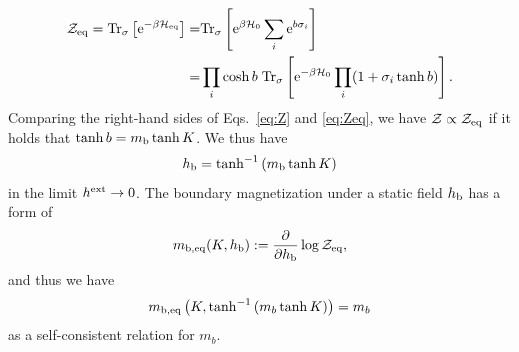 \begin{align}
\mathcal{Z}_{\rm eq}=\mathrm{Tr}_{\sigma}\left[\mathrm{e}^{-\beta\mathcal{H}_{\rm eq}}\right]=&\mathrm{Tr}_{\sigma}\left[\mathrm{e}^{\beta \mathcal{H}_{0}}\sum_{i}\mathrm{e}^{b\sigma_{i}}\right]\\
=&\prod_{i}\cosh b\;\mathrm{Tr}_{\sigma}\left[\mathrm{e}^{-\beta\mathcal{H}_{0}}\prod_{i}(1+\sigma_{i}\tanh b)\right].\label{eq:Zeq}
\end{align}
Comparing the right-hand sides of Eqs.~\eqref{eq:Z} and \eqref{eq:Zeq}, we have $\mathcal{Z} \propto\mathcal{Z}_{\rm eq}$ if it holds that $\tanh b=m_{\rm b}\tanh K$. We thus have
\begin{align}
h_{\rm b}=\tanh^{-1}\left(m_{\rm b}\tanh K\right)
\end{align}
in the limit $h^{\rm ext}\to 0$.
The boundary magnetization under a static field $h_{\rm b}$ has a form of
\begin{align}
m_{\rm b, eq}(K,h_{\rm b}):=\frac{\partial}{\partial h_{\rm b}}\log\mathcal{Z}_{\rm eq},
\end{align}
and thus we have
\begin{align}
m_{\rm b, eq}\left(K,\tanh^{-1}\left(m_{b}\tanh K\right)\right)=m_{b}\label{cond:critcond1}
\end{align}
as a self-consistent relation for $m_{b}$. 

